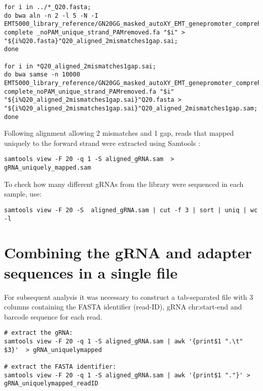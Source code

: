 \begin{small}\begin{lstlisting}
for i in ../*_Q20.fasta;
do bwa aln -n 2 -l 5 -N -I EMT5000_library_reference/GN20GG_masked_autoXY_EMT_genepromoter_comprehensive_
complete _noPAM_unique_strand_PAMremoved.fa "$i" > "${i%Q20.fasta}"Q20_aligned_2mismatches1gap.sai;
done

for i in *Q20_aligned_2mismatches1gap.sai;
do bwa samse -n 10000 EMT5000_library_reference/GN20GG_masked_autoXY_EMT_genepromoter_comprehensive_
complete_noPAM_unique_strand_PAMremoved.fa "$i" "${i%Q20_aligned_2mismatches1gap.sai}"Q20.fasta > "${i%Q20_aligned_2mismatches1gap.sai}"Q20_aligned_2mismatches1gap.sam;
done
\end{lstlisting}\end{small}

Following alignment allowing 2 mismatches and 1 gap, reads that mapped uniquely to the forward strand were extracted using Samtools \cite{Li:2009kaa}:

\begin{small}\begin{lstlisting}
samtools view -F 20 -q 1 -S aligned_gRNA.sam  > gRNA_uniquely_mapped.sam
\end{lstlisting}\end{small}

To check how many different gRNAs from the library were sequenced in each sample, use:

\begin{small}\begin{lstlisting}
samtools view -F 20 -S  aligned_gRNA.sam | cut -f 3 | sort | uniq | wc -l
\end{lstlisting}\end{small}


\section{Combining the gRNA and adapter sequences in a single file}

For subsequent analysis it was necessary to construct a tab-separated file with 3 columns containing the FASTA identifier (read-ID), gRNA chr:start-end and barcode sequence for each read.

\begin{small}\begin{lstlisting}
# extract the gRNA:
samtools view -F 20 -q 1 -S aligned_gRNA.sam | awk '{print$1 ".\t" $3}'  > gRNA_uniquelymapped

# extract the FASTA identifier:
samtools view -F 20 -q 1 -S aligned_gRNA.sam | awk '{print$1 "."}' > gRNA_uniquelymapped_readID
\end{lstlisting}\end{small}


